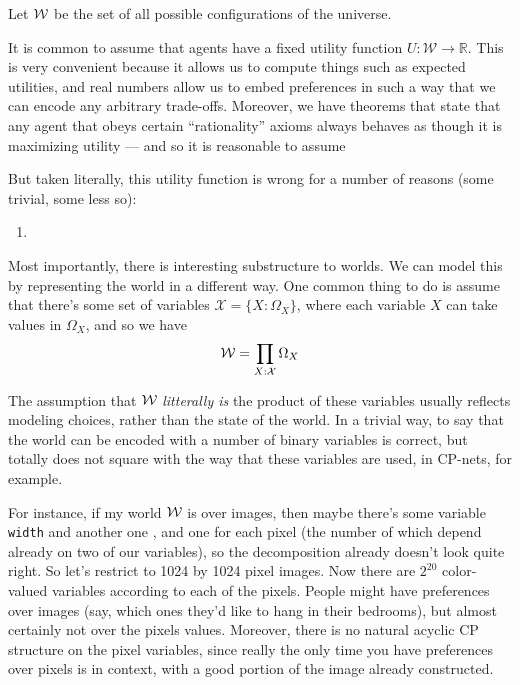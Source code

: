 \documentclass{article}
\begin{document}

	Let $\cal W$ be the set of all possible configurations of the universe.
	
	It is common to assume that agents have a fixed utility function $U: \mathcal W \to \mathbb R$. This is very convenient because it allows us to compute things such as expected utilities, and real numbers allow us to embed preferences in such a way that we can encode any arbitrary trade-offs. Moreover, we have theorems \cite{savage} that state that any agent that obeys certain ``rationality'' axioms always behaves as though it is maximizing utility --- and so it is reasonable to assume
	
	But taken literally, this utility function is wrong for a number of reasons (some trivial, some less so):
	\begin{enumerate}
		\item
	\end{enumerate}


	Most importantly, there is interesting substructure to worlds. We can model this by representing the world in a different way. One common thing to do is assume that there's some set of variables $\mathcal X = \{ X : \Omega_X \}$, where each variable $X$ can take values in $\Omega_X$, and so we have \[ \mathcal W = \prod_{X : \cal X} \Omega_X \] 
	
	The assumption that $\cal W$ \textit{litterally is} the product of these variables usually reflects modeling choices, rather than the state of the world. In a trivial way, to say that the world can be encoded with a number of binary variables is correct, but totally does not square with the way that these variables are used, in CP-nets, for example.
	
	For instance, if my world $\cal W$ is over images, then maybe there's some variable \texttt{width} and another one , and one for each pixel (the number of which depend already on two of our variables), so the decomposition already doesn't look quite right. So let's restrict to 1024 by 1024 pixel images. Now there are $2^{20}$ color-valued variables according to each of the pixels. People might have preferences over images (say, which ones they'd like to hang in their bedrooms), but almost certainly not over the pixels values. Moreover, there is no natural acyclic CP structure on the pixel variables, since really the only time you have preferences over pixels is in context, with a good portion of the image already constructed.
	
\end{document}
